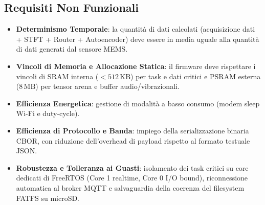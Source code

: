 \subsection{Requisiti Non Funzionali}
\begin{itemize}
	\item \textbf{Determinismo Temporale}: la quantità di dati calcolati (acquisizione dati + STFT + Router + Autoencoder) deve essere in media uguale alla quantità di dati generati dal sensore MEMS.
	\item \textbf{Vincoli di Memoria e Allocazione Statica}: il firmware deve rispettare i vincoli di SRAM interna ($< 512\,\mathrm{KB}$) per task e dati critici e PSRAM esterna ($8\,\mathrm{MB}$) per tensor arena e buffer audio/vibrazionali.
	\item \textbf{Efficienza Energetica}: gestione di modalità a basso consumo (modem sleep Wi-Fi e duty-cycle).
	\item \textbf{Efficienza di Protocollo e Banda}: impiego della serializzazione binaria CBOR, con riduzione dell'overhead di payload rispetto al formato testuale JSON.
	\item \textbf{Robustezza e Tolleranza ai Guasti}: isolamento dei task critici su core dedicati di FreeRTOS (Core 1 realtime, Core 0 I/O bound), riconnessione automatica al broker MQTT e salvaguardia della coerenza del filesystem FATFS su microSD.
\end{itemize}

